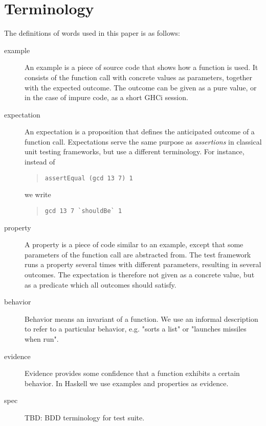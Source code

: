\documentclass[preprint]{sigplanconf}
\begin{document}
\section{Terminology}

The definitions of words used in this paper is as follows:

\begin{description}

\item[example]
    An example is a piece of source code that shows how a function is
    used.  It consists of the function call with concrete values as
    parameters, together with the expected outcome.  The outcome can
    be given as a pure value, or in the case of impure code, as a
    short GHCi session.

\item[expectation]
    An expectation is a proposition that defines the anticipated
    outcome of a function call.  Expectations serve the same purpose
    as \emph{assertions} in classical unit testing frameworks, but use
    a different terminology. For instance, instead of
    \begin{quote}
    \small
    \begin{verbatim}assertEqual (gcd 13 7) 1\end{verbatim}
    \end{quote}
    we write
    \begin{quote}
    \small
    \begin{verbatim}gcd 13 7 `shouldBe` 1\end{verbatim}
    \end{quote}

\item[property]
    A property is a piece of code similar to an example, except that
    some parameters of the function call are abstracted from.  The
    test framework runs a property several times with different
    parameters, resulting in several outcomes. The expectation is
    therefore not given as a concrete value, but as a predicate which
    all outcomes should satisfy.

\item[behavior]
    Behavior means an invariant of a function.  We use an informal description
    to refer to a particular behavior, e.g.  "sorts a list" or "launches
    missiles when run".

\item[evidence]
    Evidence provides some confidence that a function exhibits a
    certain behavior.  In Haskell we use examples and properties as
    evidence.

\item[spec]
    TBD: BDD terminology for test suite.
\end{description}
\end{document}
